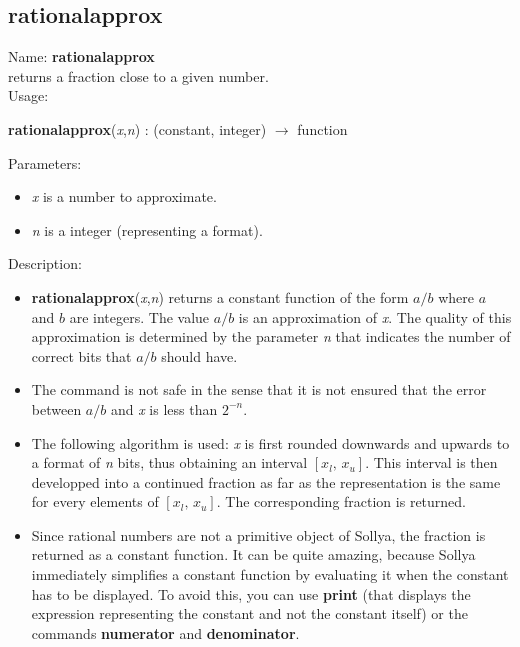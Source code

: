 \subsection{ rationalapprox }
\noindent Name: \textbf{rationalapprox}\\
returns a fraction close to a given number.\\

\noindent Usage: 
\begin{center}
\textbf{rationalapprox}(\emph{x},\emph{n}) : (\textsf{constant}, \textsf{integer}) $\rightarrow$ \textsf{function}\\
\end{center}
Parameters: 
\begin{itemize}
\item \emph{x} is a number to approximate.
\item \emph{n} is a integer (representing a format).
\end{itemize}
\noindent Description: \begin{itemize}

\item \textbf{rationalapprox}(\emph{x},\emph{n}) returns a constant function of the form $a/b$ where $a$ and $b$ are
   integers. The value $a/b$ is an approximation of \emph{x}. The quality of this 
   approximation is determined by the parameter \emph{n} that indicates the number of
   correct bits that $a/b$ should have.

\item The command is not safe in the sense that it is not ensured that the error 
   between $a/b$ and \emph{x} is less than $2^{-n}$.

\item The following algorithm is used: \emph{x} is first rounded downwards and upwards to
   a format of \emph{n} bits, thus obtaining an interval $[x_l,\,x_u]$. This interval is then
   developped into a continued fraction as far as the representation is the same
   for every elements of $[x_l,\,x_u]$. The corresponding fraction is returned.

\item Since rational numbers are not a primitive object of Sollya, the fraction is
   returned as a constant function. It can be quite amazing, because Sollya
   immediately simplifies a constant function by evaluating it when the constant
   has to be displayed.
   To avoid this, you can use \textbf{print} (that displays the expression representing
   the constant and not the constant itself) or the commands \textbf{numerator} 
   and \textbf{denominator}.
\end{itemize}
